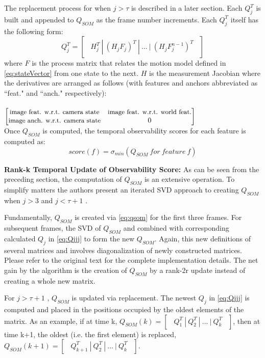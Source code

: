 \documentclass[10pt,twocolumn,letterpaper]{article}
\begin{document}
The replacement process for when $j>\tau$ is described in a later section. Each $Q_j^T$ is built and appended to ${Q}_{SOM}$ as the frame number increments. Each $Q_j^T$ itself has the following form: 
\begin{equation} \label{eq:Qjjj}
Q_j^T = \begin{bmatrix} \ \ H_j^T \ | \ (H_j F_j)^T \ | \ ... \ | \ (H_j F_j^{n-1})^T  \ \ \end{bmatrix}
\end{equation}
where $F$ is the process matrix that relates the motion model defined in \eqref{eq:stateVector} 
from one state to the next. $H$ is the measurement Jacobian where the derivatives are arranged as follows (with features and anchors abbreviated as ``feat." and ``anch." respectively):
\\\\
$\begin{bmatrix}
\small{\text{image feat. w.r.t. camera state}}&\small{\text{image feat. w.r.t. world feat.}}\\
\small{\text{image anch. w.r.t. camera state}}&0
\end{bmatrix}$\\

Once $Q_{SOM}$ is computed, the temporal observability scores for each feature is computed as:
\begin{equation} \label{eq:Qjjj}
score(f) = \sigma_{min}(Q_{SOM} \ for \ feature \ f)
\end{equation}

\textbf{Rank-k Temporal Update of Observability Score:} As can be seen from the preceding section, the computation of $Q_{SOM}$ is an extensive operation. To simplify matters the authors present an iterated SVD approach to creating $Q_{SOM}$ when $j>3$  and $j<\tau + 1$ . 

Fundamentally, $Q_{SOM}$ is created via \eqref{eq:qsom} 
for the first three frames. For subsequent frames, the SVD of $Q_{SOM}$ and combined with corresponding calculated ${Q}_{j}$ in \eqref{eq:Qjjj} to form the new $Q_{SOM}$. Again, this new definitions of several matrices and involves diagonalization of newly constructed matrices. Please refer to the original text for the complete implementation details. The net gain by the algorithm is the creation of $Q_{SOM}$ by a rank-2r update instead of creating a whole new matrix. 

For $j>\tau + 1$ , $Q_{SOM}$ is updated via replacement. The newest ${Q}_{j}$ in \eqref{eq:Qjjj} is computed and placed in the positions occupied by the oldest elements of the matrix. As an example, if at time k, $Q_{SOM}(k) = \begin{bmatrix} \ \ Q_1^T \ | \ Q_2^T \ | \ ... \ | \ Q_k^T  \ \ \end{bmatrix}$, then at time k+1, the oldest (i.e. the first element) is replaced, ${Q}_{SOM}(k+1) = \begin{bmatrix}\ \ Q_{k+1}^T \ | \ Q_2^T \ | \ ... \ | \ Q_k^T\ \ \end{bmatrix}$.
\end{document}
